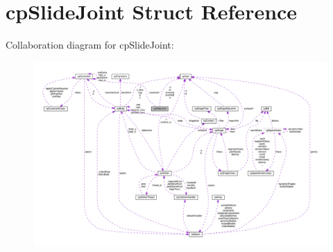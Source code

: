 \hypertarget{structcpSlideJoint}{}\section{cp\+Slide\+Joint Struct Reference}
\label{structcpSlideJoint}


Collaboration diagram for cp\+Slide\+Joint\+:
\nopagebreak
\begin{figure}[H]
\begin{center}
\leavevmode
\includegraphics[width=350pt]{structcpSlideJoint__coll__graph}
\end{center}
\end{figure}
